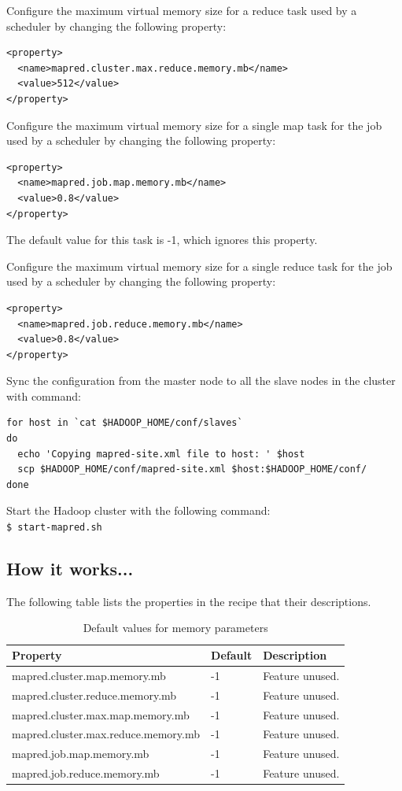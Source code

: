 Configure the maximum virtual memory size for a reduce task used by a scheduler by changing the following property:
\lstset{style=bashstyle}
\begin{lstlisting}
<property>
  <name>mapred.cluster.max.reduce.memory.mb</name>
  <value>512</value>
</property>
\end{lstlisting}


Configure the maximum virtual memory size for a single map task for the job used by a scheduler by changing the following property:
\lstset{style=bashstyle}
\begin{lstlisting}
<property>
  <name>mapred.job.map.memory.mb</name>
  <value>0.8</value>
</property>
\end{lstlisting}

The default value for this task is -1, which ignores this property.


Configure the maximum virtual memory size for a single reduce task for the job used by a scheduler by changing the following property:
\lstset{style=bashstyle}
\begin{lstlisting}
<property>
  <name>mapred.job.reduce.memory.mb</name>
  <value>0.8</value>
</property>
\end{lstlisting}


Sync the configuration from the master node to all the slave nodes in the cluster with command:
\lstset{style=bashstyle}
\begin{lstlisting}
for host in `cat $HADOOP_HOME/conf/slaves`
do
  echo 'Copying mapred-site.xml file to host: ' $host
  scp $HADOOP_HOME/conf/mapred-site.xml $host:$HADOOP_HOME/conf/
done
\end{lstlisting}


Start the Hadoop cluster with the following command: \\
\verb|$ start-mapred.sh|

\subsection*{How it works...}
The following table lists the properties in the recipe that their descriptions.

\begin{table}[h]
  \centering
  \begin{tabular}{lll}
    \toprule
    \textbf{Property} &  \textbf{Default} &  \textbf{Description} \\ \midrule
      mapred.cluster.map.memory.mb & -1 & Feature unused. \\
      mapred.cluster.reduce.memory.mb & -1 & Feature unused. \\
      mapred.cluster.max.map.memory.mb & -1 & Feature unused. \\
      mapred.cluster.max.reduce.memory.mb & -1 & Feature unused. \\
      mapred.job.map.memory.mb & -1 & Feature unused. \\
      mapred.job.reduce.memory.mb & -1 & Feature unused. \\ \bottomrule
  \end{tabular}
  \caption{Default values for memory parameters}\label{tbl:memoryconfig.default}
\end{table}

